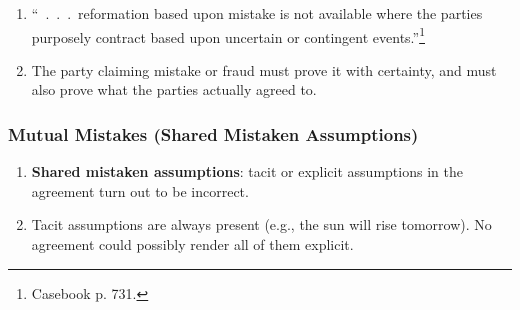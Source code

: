 \begin{enumerate}
    \item ``~.~.~.~reformation based upon mistake is not available where the 
    parties purposely contract based upon uncertain or contingent 
    events.''\footnote{Casebook p. 731.}
    \item The party claiming mistake or fraud must prove it with certainty, 
    and must also prove what the parties actually agreed to.
\end{enumerate}

\subsubsection{Mutual Mistakes (Shared Mistaken Assumptions)}

\begin{enumerate}
    \item \textbf{Shared mistaken assumptions}: tacit or explicit assumptions 
    in the agreement turn out to be incorrect.
    \item Tacit assumptions are always present (e.g., the sun will rise 
    tomorrow). No agreement could possibly render all of them explicit.
\end{enumerate}

